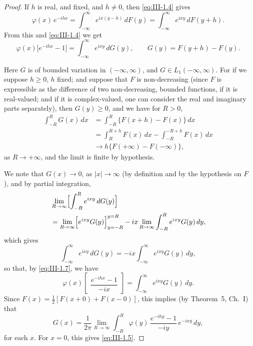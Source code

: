 \begin{proof}
If $h$ is real, and fixed, and $h\neq0$, then \eqref{eq:III-1.4} gives
\begin{equation}\tag{1.6}\label{eq:III-1.6}
\varphi(x)\,e^{-ihx}=\int_{-\infty}^{\infty}e^{ix(y-h)}\,dF(y)=\int_{-\infty}^{\infty}e^{ixy}\,dF(y+h).
\end{equation}
From this and \eqref{eq:III-1.4} we get
\begin{equation}\tag{1.7}\label{eq:III-1.7}
\varphi(x)\bigl[e^{-ihx}-1\bigr]=\int_{-\infty}^{\infty}e^{ixy}\,dG(y),\qquad G(y)=F(y+h)-F(y).
\end{equation}

Here $G$ is of bounded variation in $(-\infty,\infty)$, and $G\in L_{1}(-\infty,\infty)$. For if we suppose $h\ge0$, $h$ fixed; and suppose that $F$ is non-decreasing (since $F$ is expressible as the difference of two non-decreasing, bounded functions, if it is real-valued; and if it is complex-valued, one can consider the real and imaginary parts separately), then $G(y)\ge0$, and we have for $R>0$,
\[
\begin{aligned}
\int_{-R}^{R}G(x)\,dx &= \int_{-R}^{R}\bigl\{F(x+h)-F(x)\bigr\}\,dx\\
&= \int_{R}^{R+h}F(x)\,dx-\int_{-R}^{-R+h}F(x)\,dx\\
&\to h\bigl\{F(+\infty)-F(-\infty)\bigr\},
\end{aligned}
\]
as $R\to+\infty$, and the limit is finite by hypothesis.

We note that $G(x)\to0$, as $|x|\to\infty$ (by definition and by the hypothesis on $F$), and by partial integration,
\[
\begin{aligned}
&\lim_{R\to\infty}  \Bigl[\int_{-R}^{R}e^{ixy}\,dG(y)\Bigr]\\
&= \lim_{R\to\infty}  \Bigl[e^{ixy}G(y)\Bigr]_{y=-R}^{y=R} - ix\lim_{R\to\infty}  \int_{-R}^{R}e^{ixy}G(y)\,dy,
\end{aligned}
\]
which gives
\[
\int_{-\infty}^{\infty}e^{ixy}\,dG(y)=-ix\int_{-\infty}^{\infty}e^{ixy}G(y)\,dy,
\]
so that, by \eqref{eq:III-1.7}, we have
\[
\varphi(x)\begin{bmatrix}\dfrac{e^{-ihx}-1}{-ix}\end{bmatrix}
=\int_{-\infty}^{\infty}e^{ixy}G(y)\,dy.
\]
Since $F(x)=\frac12[F(x+0)+F(x-0)]$, this implies (by Theorem~5, Ch.~I) that
\[
G(x)=\frac{1}{2\pi}\lim_{R\to\infty}\int_{-R}^{R}\varphi(y)\,\frac{e^{-ihy}-1}{-iy}\,e^{-ixy}\,dy,
\]
for each $x$. For $x=0$, this gives \eqref{eq:III-1.5}.
\end{proof}

